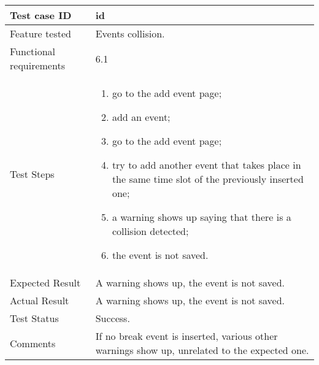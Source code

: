 \begin{table}[H]
	\begin{center}
		\begin{tabular}{ | p{} | p{} | }
		\hline
		Test case ID & id\\
		\hline
		Feature tested & Events collision.\\
    	\hline
		Functional requirements & 6.1  \\
		\hline
		Test Steps & 
			\begin{enumerate}
				\item go to the add event page;
				\item add an event;
				\item go to the add event page;
				\item try to add another event that takes place in the same time slot of the previously inserted one;
				\item a warning shows up saying that there is a collision detected;
				\item the event is not saved.
			\end{enumerate} \\
		\hline
		Expected Result & A warning shows up, the event is not saved.\\
		\hline
		Actual Result & A warning shows up, the event is not saved.\\ 
		\hline
		Test Status & \color{ForestGreen}Success.\\ 
		\hline
		Comments & If no break event is inserted, various other warnings show up, unrelated to the expected one. \\
		\hline
		
		\end{tabular}
	\end{center}
\end{table}

